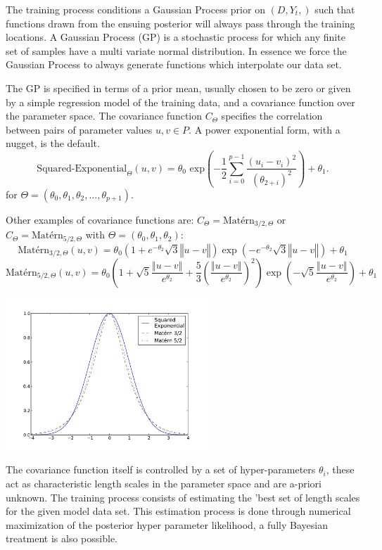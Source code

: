 \documentclass{article}
\begin{document}
The training process conditions a Gaussian Process prior on 
$(D,Y_t,)$ such that functions drawn from the ensuing posterior will
always pass through the training locations. A Gaussian Process (GP) is
a stochastic process for which any finite set of samples have a multi
variate normal distribution. In essence we force the Gaussian Process
to always generate functions which interpolate our data set.

The GP is specified in terms of a prior mean, usually chosen to be
zero or given by a simple regression model of the training data, and a
covariance function over the parameter space. The covariance function $C_Θ$
specifies the correlation between pairs of parameter values $u, v ∈
P$. A power exponential form, with a nugget, is the default.  
\[
\textrm{Squared-Exponential}_Θ(u, v)
 = θ_0 \textrm{~exp}\left({-\frac{1}{2} \sum_{i=0}^{p-1} \frac{(u_i - v_i)^2}{(θ_{2+i})^2}}\right) + θ_1. \]
for $Θ = (θ_0, θ_1, θ_2, …, θ_{p+1})$.

Other examples of covariance functions are: $C_Θ = \textrm{Matérn}_{3/2,Θ}$ or 
$C_Θ = \textrm{Matérn}_{5/2,Θ}$ with $Θ = ({θ_0}, {θ_1}, {θ_2})$:
\[
\textrm{Matérn}_{3/2,Θ}(u,v) = 
{θ_0} \left({ 1 + e^{- θ_2} \sqrt{3} ‖u-v‖ }\right) 
\exp \left({ - e^{- θ_2} \sqrt{3} ‖u-v‖ }\right) + {θ_1}
\]
\[
\textrm{Matérn}_{5/2,Θ}(u,v) = 
{θ_0} \left({ 1 + \sqrt{5}  \dfrac{ ‖u-v‖}{e^{θ_2}}
 + \dfrac{5}{3} \left({\dfrac{‖u-v‖}{e^{θ_2}}}\right)^2  }\right) 
\exp \left({ - \sqrt{5}\dfrac{ ‖u-v‖}{e^{θ_2}} }\right) + {θ_1} \]

\begin{center}
\includegraphics[width=3in]{figures/kernel_functions.pdf}
\end{center}

The covariance function itself is controlled by a set of
hyper-parameters $θ_i$, these act as characteristic length scales in
the parameter space and are a-priori unknown. The training process
consists of estimating the 'best set of length scales for the given
model data set. This estimation process is done through numerical
maximization of the posterior hyper parameter likelihood, a fully
Bayesian treatment is also possible.
\end{document}

